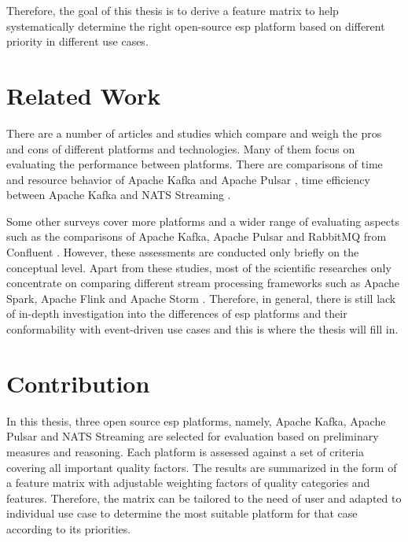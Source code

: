 Therefore, the goal of this thesis is to derive a feature matrix to help systematically determine the right open-source \acrlong{esp} platform based on different priority in different use cases.


\section{Related Work}
There are a number of articles and studies which compare and weigh the pros and cons of different platforms and technologies. Many of them focus on evaluating the performance between platforms. There are comparisons of time and resource behavior of Apache Kafka and Apache Pulsar \cite{intorruk2019comparative} \cite{benchmarkkafkapulsar}, time efficiency between Apache Kafka and NATS Streaming \cite{benchmarknatskafka}.

Some other surveys cover more platforms and a wider range of evaluating aspects such as the comparisons of Apache Kafka, Apache Pulsar and RabbitMQ from Confluent \cite{overallcomparekafka} \cite{benchmarkkafkapulsarrabbitmq}. However, these assessments are conducted only briefly on the conceptual level. Apart from these studies, most of the scientific researches only concentrate on comparing different stream processing frameworks such as Apache Spark, Apache Flink and Apache Storm \cite{karimov2018benchmarking} \cite{isah2019survey} \cite{lopez2016performance}. Therefore, in general, there is still lack of in-depth investigation into the differences of \acrlong{esp} platforms and their conformability with event-driven use cases and this is where the thesis will fill in.
 
\section{Contribution}
In this thesis, three open source \acrlong{esp} platforms, namely, Apache Kafka, Apache Pulsar and NATS Streaming are selected for evaluation based on preliminary measures and reasoning. Each platform is assessed against a set of criteria covering all important quality factors. The results are summarized in the form of a feature matrix with adjustable weighting factors of quality categories and features. Therefore, the matrix can be tailored to the need of user and adapted to individual use case to determine the most suitable platform for that case according to its priorities.


